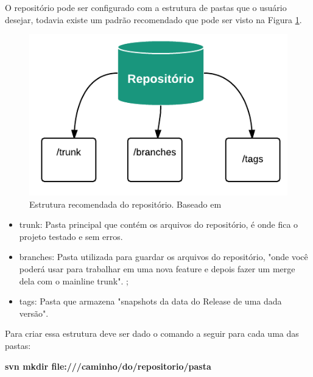 O repositório pode ser configurado com a estrutura de pastas que o usuário desejar, todavia existe um padrão recomendado que pode ser visto na Figura 
\ref{fig:estrutura_repo}.

\begin{figure}[!htb]
\centering
\includegraphics[scale=1]{figuras/estrutura_repo.png}
\caption{Estrutura recomendada do repositório. Baseado em \cite{svn-book}}
\label{fig:estrutura_repo}
\end{figure}

\begin{itemize}
  \item trunk: Pasta principal que contém os arquivos do repositório, é onde fica o projeto testado e sem erros. \cite{wiki-svn}

  \item branches: Pasta utilizada para guardar os arquivos do repositório, "onde você poderá usar para trabalhar em uma nova feature e depois fazer um merge dela com o mainline trunk". \cite{wiki-svn};

  \item tags: Pasta que armazena "snapshots da data do Release de uma dada versão". \cite{wiki-svn}
\end{itemize}

Para criar essa estrutura deve ser dado o comando a seguir para cada uma das pastas: \cite{wiki-svn}

\begin{centering}

\colorbox{PineGreen}{
\begin{minipage}{280px}
  \textbf{svn mkdir file:///caminho/do/repositorio/pasta}
\end{minipage}
}

\end{centering}

